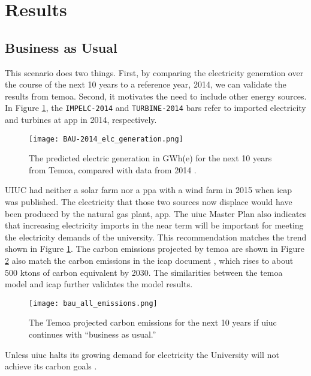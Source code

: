 \section{Results}

\subsection{Business as Usual}

This scenario does two things. First, by comparing the electricity generation
over the course of the next 10 years to a reference year, 2014, we can validate
the results from \gls{temoa}. Second, it motivates the need to include other
energy sources.
In Figure \ref{fig:bau-2014}, the \texttt{IMPELC-2014}
and \texttt{TURBINE-2014} bars refer to imported electricity and turbines
at \gls{app} in 2014, respectively.

\begin{figure}[ht]
	\centering
	\texttt{[image: BAU-2014\_elc\_generation.png]}
	\caption{The predicted electric generation in GWh(e) for the next 10 years
	from Temoa, compared with data from 2014 \cite{isee_illinois_2015}.}
	\label{fig:bau-2014}
\end{figure}

UIUC had neither a solar farm nor a \gls{ppa} with a wind farm
in 2015 when \gls{icap} was published.
The electricity that those two sources now displace would have been produced by
the natural gas plant, \gls{app}.
The \gls{uiuc} Master Plan \cite{affiliated_engineers_inc_utilities_2015}
also indicates that increasing electricity imports in the near term will be
important for meeting the electricity demands of the university. This
recommendation matches the trend shown in Figure \ref{fig:bau-2014}.
The carbon emissions projected by \gls{temoa} are shown in Figure \ref{fig:bau-emissions}
also match the carbon emissions in the \gls{icap} document
\cite{isee_illinois_2015}, which rises to about 500
ktons of carbon equivalent by 2030. The similarities between the \gls{temoa}
model and \gls{icap} further validates the model results.

\begin{figure}[ht]
	\centering
	\texttt{[image: bau\_all\_emissions.png]}
	\caption{The Temoa projected carbon emissions for the next 10 years if
	\gls{uiuc} continues with ``business as usual.''}
	\label{fig:bau-emissions}
\end{figure}

Unless \gls{uiuc} halts its growing demand for electricity the University will
not achieve its carbon goals \cite{isee_illinois_2015, affiliated_engineers_inc_utilities_2015}.


